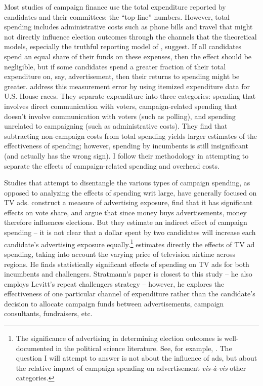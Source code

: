 \documentclass{article}
\begin{document}
Most studies of campaign finance use the total expenditure reported by candidates and their committees: the ``top-line'' numbers. However, total spending includes administrative costs such as phone bills and travel that might not directly influence election outcomes through the channels that the theoretical models, especially the truthful reporting model of \cite{coate2004pareto}, suggest. If all candidates spend an equal share of their funds on these expenses, then the effect should be negligible, but if some candidates spend a greater fraction of their total expenditure on, say, advertisement, then their returns to spending might be greater. \cite{ansolabehere1994mismeasure} address this measurement error by using itemized expenditure data for U.S. House races. They separate expenditure into three categories: spending that involves direct communication with voters, campaign-related spending that doesn't involve communication with voters (such as polling), and spending unrelated to campaigning (such as administrative costs). They find that subtracting non-campaign costs from total spending yields larger estimates of the effectiveness of spending; however, spending by incumbents is still insignificant (and actually has the wrong sign). I follow their methodology in attempting to separate the effects of campaign-related spending and overhead costs.

Studies that attempt to disentangle the various types of campaign spending, as opposed to analyzing the effects of spending writ large, have generally focused on TV ads. \cite{goldstein2000new} construct a measure of advertising exposure, find that it has significant effects on vote share, and argue that since money buys advertisements, money therefore influences elections. But they estimate an indirect effect of campaign spending -- it is not clear that a dollar spent by two candidates will increase each candidate's advertising exposure equally.\footnote{The significance of advertising in determining election outcomes is well-documented in the political science literature. See, for example, \cite{shaw1999effect}. The question I will attempt to answer is not about the influence of ads, but about the relative impact of campaign spending on advertisement \textit{vis-\`{a}-vis} other categories.} \cite{stratmann2009prices} estimates directly the effects of TV ad spending, taking into account the varying price of television airtime across regions. He finds statistically significant effects of spending on TV ads for both incumbents and challengers. Stratmann's paper is closest to this study -- he also employs Levitt's repeat challengers strategy -- however, he explores the effectiveness of one particular channel of expenditure rather than the candidate's decision to allocate campaign funds between advertisements, campaign consultants, fundraisers, etc.
\end{document}
